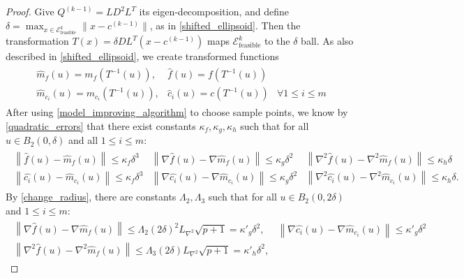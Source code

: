 \documentclass{article}
\theoremstyle{case}
\numberwithin{theorem}{subsection}
\newcommand{\ckmo}{{c^{(k-1)}}}
\newcommand{\liphess}{{L_{\nabla^2}}}
\newcommand{\qkmo}{{Q^{(k-1)}}}
\newcommand{\unshiftedellipsoid}{{\mathcal E^k_{\textrm{feasible}}}}
\begin{document}
\begin{proof}
Give $\qkmo = LD^2L^T$ its eigen-decomposition, and define $\delta = \max_{x \in \unshiftedellipsoid} \|x - \ckmo\|$, as in \cref{shifted_ellipsoid}.
Then the transformation $T(x) = \delta D L^T(x - \ckmo)$ maps $\unshiftedellipsoid$ to the $\delta$ ball.
As also described in \cref{shifted_ellipsoid}, we create transformed functions
\begin{align*}
\begin{array}{ccc}
\hat {m}_f(u) = m_f(T^{-1}(u)),&  \hat f (u) = f(T^{-1}(u)) &\\
\hat {m}_{c_i}(u) = m_{c_i}(T^{-1}(u)), &  \hat c_i (u) = c(T^{-1}(u))& \forall 1 \le i \le m
\end{array}
\end{align*}
After using \cref{model_improving_algorithm} to choose sample points, we know by \cref{quadratic_errors} that
there exist constants $\kappa_f, \kappa_g, \kappa_h$ such that for all $u \in B_2(0, \delta)$ and all $1\le i\le m$:
\begin{align*}
\begin{array}{ccc}
\left\| \hat {f}\left(u\right) -  \hat{m}_f\left(u\right) \right\|\le \kappa_f \delta^3 &
\left\|\nabla \hat {f}\left(u\right) - \nabla \hat{m}_f\left(u\right) \right\|\le \kappa_g \delta^2 &
\left\|\nabla^2 \hat {f}\left(u\right) - \nabla^2 \hat{m}_f\left(u\right) \right\|\le \kappa_h \delta \\
\left\| \hat {{c_i}}\left(u\right) -  \hat{m}_{c_i}\left(u\right) \right\|\le \kappa_f \delta^3 &
\left\|\nabla \hat {{c_i}}\left(u\right) - \nabla \hat{m}_{c_i}\left(u\right) \right\|\le \kappa_g \delta^2 &
\left\|\nabla^2 \hat {{c_i}}\left(u\right) - \nabla^2 \hat{m}_{c_i}\left(u\right) \right\|\le \kappa_h \delta.
\end{array}
\end{align*}
By \cref{change_radius}, there are constants $\Lambda_2, \Lambda_3$ such that for all $u \in B_2(0, 2\delta)$ and $1\le i\le m$:
\begin{align*}
\begin{array}{cc}
\left\|\nabla \hat {f}\left(u\right) - \nabla \hat{m}_f\left(u\right) \right\|\le \Lambda_2 \left(2\delta\right)^2 \liphess \sqrt{p+1} = {\kappa'}_g\delta^2, &
\left\|\nabla \hat {c_i}\left(u\right) - \nabla \hat{m}_{c_i}\left(u\right) \right\|\le {\kappa'}_g\delta^2 \\
\left\|\nabla^2 \hat {f}\left(u\right) - \nabla^2 \hat{m}_f\left(u\right) \right\|\le \Lambda_3 \left(2\delta\right) \liphess \sqrt{p+1} = {\kappa'}_h\delta^2, &

\end{array}
\end{align*}
\end{proof}
\end{document}
